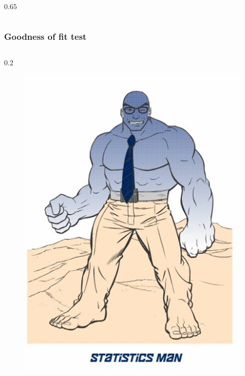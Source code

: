 \documentclass[aspectratio=169]{beamer}
\begin{document}
\begin{frame}
\begin{columns}
\begin{column} {0.65\textwidth}
    \end{column}
  \end{columns}
\end{frame}

\begin{frame}
\frametitle{Goodness of fit test}
\begin{columns}
  \begin{column} {0.2 \textwidth}
    
    \begin{figure}
      \centering
      \includegraphics[width=\textwidth]{img/les6-man.jpg}
    \end{figure}
    
  \end{column}
  

\end{columns}
\end{frame}
\end{document}
